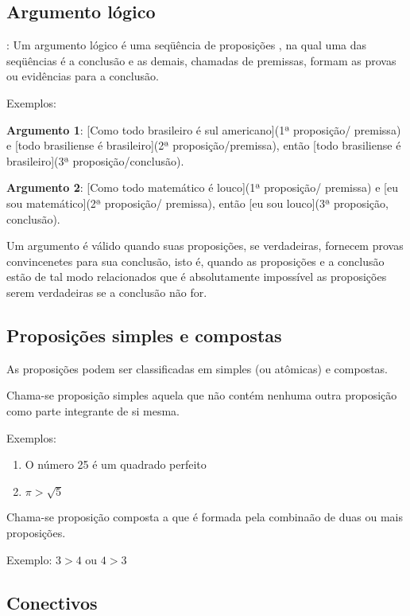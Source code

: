 \subsection{Argumento lógico}
\begin{definicao}: Um argumento lógico é uma seqüência de proposições , na qual uma das seqüências é a conclusão e as demais, chamadas de premissas, formam as provas ou evidências para a conclusão.\end{definicao}

Exemplos:

\textbf{Argumento 1}: [Como todo brasileiro é sul americano](1ª proposição/ premissa) e [todo brasiliense é brasileiro](2ª proposição/premissa), então [todo brasiliense é brasileiro](3ª proposição/conclusão).

\textbf{Argumento 2}: [Como todo matemático é louco](1ª proposição/ premissa) e [eu sou matemático](2ª proposição/ premissa), então [eu sou louco](3ª proposição, conclusão).

Um argumento é válido quando suas proposições, se verdadeiras, fornecem provas convincenetes para sua conclusão, isto é, quando as proposições e a conclusão estão de tal modo relacionados que é absolutamente impossível as proposições serem verdadeiras se a conclusão não for.

\subsection{Proposições simples e compostas}

As proposições podem ser classificadas em simples (ou atômicas) e compostas.

Chama-se proposição simples aquela que não contém nenhuma outra proposição como parte integrante de si mesma.

Exemplos:
\begin{enumerate}
\item O número 25 é um quadrado perfeito
\item $\pi>\sqrt{5}$
\end{enumerate}

Chama-se proposição composta a que é formada pela combinaão de duas ou mais proposições.

Exemplo: $3>4$ ou $4>3$

\subsection{Conectivos}

